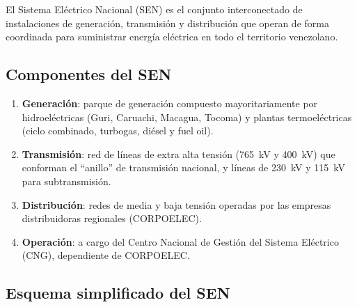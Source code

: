 \documentclass[12pt,a4paper]{article}
\begin{document}
El Sistema Eléctrico Nacional (SEN) es el conjunto interconectado de
instalaciones de generación, transmisión y distribución que operan de
forma coordinada para suministrar energía eléctrica en todo el
territorio venezolano.

\subsection{Componentes del SEN}

\begin{enumerate}[nosep]
    \item \textbf{Generación}: parque de generación compuesto
          mayoritariamente por hidroeléctricas (Guri, Caruachi,
          Macagua, Tocoma) y plantas termoeléctricas (ciclo combinado,
          turbogas, diésel y fuel oil).
    \item \textbf{Transmisión}: red de líneas de extra alta tensión
          (\SI{765}{\kilo\volt} y \SI{400}{\kilo\volt}) que conforman
          el ``anillo'' de transmisión nacional, y líneas de
          \SI{230}{\kilo\volt} y \SI{115}{\kilo\volt} para
          subtransmisión.
    \item \textbf{Distribución}: redes de media y baja tensión
          operadas por las empresas distribuidoras regionales
          (CORPOELEC).
    \item \textbf{Operación}: a cargo del Centro Nacional de Gestión
          del Sistema Eléctrico (CNG), dependiente de CORPOELEC.
\end{enumerate}

\subsection{Esquema simplificado del SEN}
\end{document}
